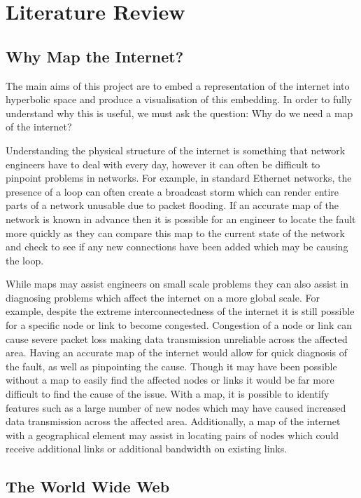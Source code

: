 \chapter{Literature Review}
\label{cha:LitReview}

\section{Why Map the Internet?}
\label{sec:LitReviewWhyMap}

The main aims of this project are to embed a representation of the internet into hyperbolic space and produce a visualisation of this embedding. In order to fully understand why this is useful, we must ask the question: Why do we need a map of the internet? 

Understanding the physical structure of the internet is something that network engineers have to deal with every day, however it can often be difficult to pinpoint problems in networks. For example, in standard Ethernet networks, the presence of a loop can often create a broadcast storm which can render entire parts of a network unusable due to packet flooding. If an accurate map of the network is known in advance then it is possible for an engineer to locate the fault more quickly as they can compare this map to the current state of the network and check to see if any new connections have been added which may be causing the loop. 

While maps may assist engineers on small scale problems they can also assist in diagnosing problems which affect the internet on a more global scale. For example, despite the extreme interconnectedness of the internet it is still possible for a specific node or link to become congested. Congestion of a node or link can cause severe packet loss making data transmission unreliable across the affected area. Having an accurate map of the internet would allow for quick diagnosis of the fault, as well as pinpointing the cause. Though it may have been possible without a map to easily find the affected nodes or links it would be far more difficult to find the cause of the issue. With a map, it is possible to identify features such as a large number of new nodes which may have caused increased data transmission across the affected area. Additionally, a map of the internet with a geographical element may assist in locating pairs of nodes which could receive additional links or additional bandwidth on existing links.

\section{The World Wide Web}

